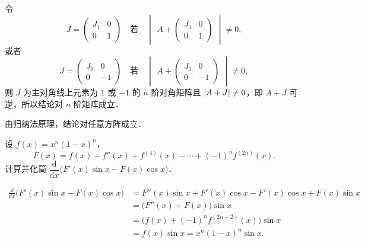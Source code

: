 \begin{solution}
令
\[
J=\begin{pmatrix}J_{1} & 0\\ 0 & 1\end{pmatrix}\quad\text{若}\quad
\begin{vmatrix}A+\begin{pmatrix}J_{1} & 0\\ 0 & 1\end{pmatrix}\end{vmatrix}\ne 0,
\]
或者
\[
J=\begin{pmatrix}J_{1} & 0\\ 0 & -1\end{pmatrix}\quad\text{若}\quad
\begin{vmatrix}A+\begin{pmatrix}J_{1} & 0\\ 0 & -1\end{pmatrix}\end{vmatrix}\ne 0,
\]
则 $J$ 为主对角线上元素为 $1$ 或 $-1$ 的 $n$ 阶对角矩阵且 $\left|A+J\right|\ne 0$，即 $A+J$ 可逆，所以结论对 $n$ 阶矩阵成立．

由归纳法原理，结论对任意方阵成立．
\end{solution}

设 $f(x)=x^{n}(1-x)^{n}$，
\[
F(x)=f(x)-f''(x)+f^{(4)}(x)-\cdots+(-1)^{n}f^{(2n)}(x).
\]
计算并化简 $\dfrac{\mathrm{d}}{\mathrm{d}x}\bigl(F'(x)\sin x-F(x)\cos x\bigr)$．
\begin{solution}
\begin{align*}
\frac{\dd}{\dd x}\bigl(F'(x)\sin x-F(x)\cos x\bigr)
&=F''(x)\sin x+F'(x)\cos x-F'(x)\cos x+F(x)\sin x\\
&=\bigl(F''(x)+F(x)\bigr)\sin x\\
&=\bigl(f(x)+(-1)^{n}f^{(2n+2)}(x)\bigr)\sin x\\
&=f(x)\sin x=x^{n}(1-x)^{n}\sin x.
\end{align*}
\end{solution}

